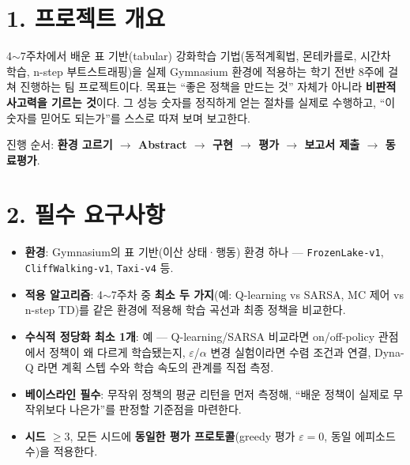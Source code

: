 \documentclass[12pt]{article}
\begin{document}

\section*{1. 프로젝트 개요}
4$\sim$7주차에서 배운 표 기반(tabular) 강화학습 기법(동적계획법,
몬테카를로, 시간차 학습, n-step 부트스트래핑)을 실제 Gymnasium
환경에 적용하는 학기 전반 8주에 걸쳐 진행하는 팀 프로젝트이다. 목표는 ``좋은 정책을
만드는 것'' 자체가 아니라 \textbf{비판적 사고력을 기르는 것}이다. 그 성능
숫자를 정직하게 얻는 절차를 실제로 수행하고, ``이 숫자를 믿어도 되는가''를
스스로 따져 보며 보고한다.

\vspace{4pt}
\noindent 진행 순서: \textbf{환경 고르기 $\to$ Abstract $\to$ 구현 $\to$ 평가 $\to$ 보고서 제출 $\to$ 동료평가}.

\section*{2. 필수 요구사항}
\begin{itemize}
\item \textbf{환경}: Gymnasium의 표 기반(이산 상태·행동) 환경
  하나 --- \texttt{FrozenLake-v1}, \texttt{CliffWalking-v1},
  \texttt{Taxi-v4} 등.
\item \textbf{적용 알고리즘}: 4$\sim$7주차 중 \textbf{최소 두
  가지}(예: Q-learning vs SARSA, MC 제어 vs n-step TD)를 같은
  환경에 적용해 학습 곡선과 최종 정책을 비교한다.
\item \textbf{수식적 정당화 최소 1개}: 예 --- Q-learning/SARSA
  비교라면 on/off-policy 관점에서 정책이 왜 다르게 학습됐는지,
  $\varepsilon$/$\alpha$ 변경 실험이라면 수렴 조건과 연결, Dyna-Q
  라면 계획 스텝 수와 학습 속도의 관계를 직접 측정.
\item \textbf{베이스라인 필수}: 무작위 정책의 평균 리턴을 먼저
  측정해, ``배운 정책이 실제로 무작위보다 나은가''를 판정할
  기준점을 마련한다.
\item \textbf{시드 $\ge 3$}, 모든 시드에 \textbf{동일한 평가
  프로토콜}(greedy 평가 $\varepsilon=0$, 동일 에피소드 수)을
  적용한다.
\end{itemize}

\newpage
\end{document}
